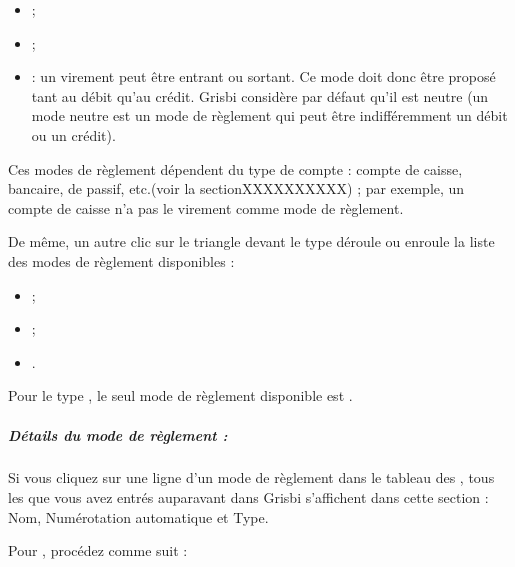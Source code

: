 \begin{itemize}
	\item {} ;
	\item {} ;
	\item {} : un virement peut être entrant ou sortant. Ce mode doit donc être proposé tant au débit qu'au crédit. Grisbi considère par défaut qu'il est neutre (un mode neutre est un mode de règlement qui peut être indifféremment un débit ou un crédit).
\end{itemize}

Ces modes de règlement dépendent du type de compte : compte de caisse, bancaire, de passif, etc.(voir la sectionXXXXXXXXXX) ; par exemple, un compte de caisse n'a pas le virement comme mode de règlement.

De même, un autre clic sur le triangle devant le type  déroule ou enroule la liste des modes de règlement disponibles :

\begin{itemize}
	\item {} ;
	\item {} ;
	\item {}.
\end{itemize}

Pour le type , le seul mode de règlement disponible est .

\ifIllustration
\else
\fi




\subparagraph{Détails du  mode de règlement :\label{setup-resources-modes-details}}


Si vous cliquez sur une ligne d'un mode de règlement dans le tableau des , tous les  que vous avez entrés auparavant dans Grisbi s'affichent dans cette section : Nom, Numérotation automatique et Type.


Pour , procédez comme suit :

